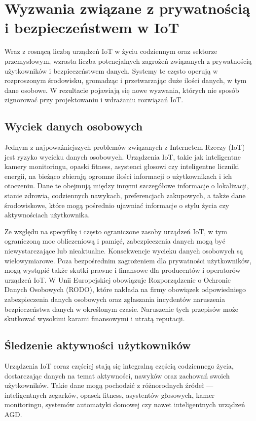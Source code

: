 \section{Wyzwania związane z prywatnością i bezpieczeństwem w IoT}
Wraz z rosnącą liczbą urządzeń IoT w życiu codziennym oraz sektorze przemysłowym, wzrasta liczba potencjalnych zagrożeń związanych z prywatnością użytkowników i bezpieczeństwem danych. Systemy te często operują w rozproszonym środowisku, gromadząc i przetwarzając duże ilości danych, w tym dane osobowe. W rezultacie pojawiają się nowe wyzwania, których nie sposób zignorować przy projektowaniu i wdrażaniu rozwiązań IoT.
\subsection{Wyciek danych osobowych}
Jednym z najpoważniejszych problemów związanych z Internetem Rzeczy (IoT) jest ryzyko wycieku danych osobowych. Urządzenia IoT, takie jak inteligentne kamery monitoringu, opaski fitness, asystenci głosowi czy inteligentne liczniki energii, na bieżąco zbierają ogromne ilości informacji o użytkownikach i ich otoczeniu. Dane te obejmują między innymi szczegółowe informacje o lokalizacji, stanie zdrowia, codziennych nawykach, preferencjach zakupowych, a także dane środowiskowe, które mogą pośrednio ujawniać informacje o stylu życia czy aktywnościach użytkownika.

Ze względu na specyfikę i często ograniczone zasoby urządzeń IoT, w tym ograniczoną moc obliczeniową i pamięć, zabezpieczenia danych mogą być niewystarczające lub nieaktualne.
Konsekwencje wycieku danych osobowych są wielowymiarowe. Poza bezpośrednim zagrożeniem dla prywatności użytkowników, mogą wystąpić także skutki prawne i finansowe dla producentów i operatorów urządzeń IoT. W Unii Europejskiej obowiązuje Rozporządzenie o Ochronie Danych Osobowych (RODO), które nakłada na firmy obowiązek odpowiedniego zabezpieczenia danych osobowych oraz zgłaszania incydentów naruszenia bezpieczeństwa danych w określonym czasie. Naruszenie tych przepisów może skutkować wysokimi karami finansowymi i utratą reputacji.
\subsection{Śledzenie aktywności użytkowników}
Urządzenia IoT coraz częściej stają się integralną częścią codziennego życia, dostarczając danych na temat aktywności, nawyków oraz zachowań swoich użytkowników. Takie dane mogą pochodzić z różnorodnych źródeł — inteligentnych zegarków, opasek fitness, asystentów głosowych, kamer monitoringu, systemów automatyki domowej czy nawet inteligentnych urządzeń AGD.

